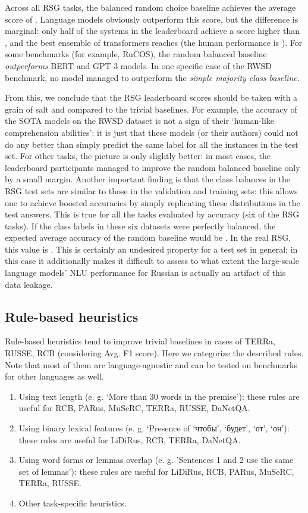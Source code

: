 \documentclass[11pt]{article}
\begin{document}
Across all RSG tasks, the balanced random choice baseline achieves the average score of . Language models obviously outperform this score, but the difference is marginal: only half of the systems in the leaderboard achieve a score higher than , and the best ensemble of transformers reaches  (the human performance is ). For some benchmarks (for example, RuCOS), the random balanced baseline \textit{outperforms} BERT and GPT-3 models. In one specific case of the RWSD benchmark, no model managed to outperform the \textit{simple majority class baseline}.

From this, we conclude that the RSG leaderboard scores should be taken with a grain of salt and compared to the trivial baselines. For example, the  accuracy of the SOTA models on the RWSD dataset is not a sign of their `human-like comprehension abilities': it is just that these models (or their authors) could not do any better than simply predict the same label for all the instances in the test set. For other tasks, the picture is only slightly better: in most cases, the leaderboard participants managed to improve the random balanced baseline only by a small margin. Another important finding is that the class balances in the RSG test sets are similar to those in the validation and training sets: this allows one to achieve boosted accuracies by simply replicating these distributions in the test answers. This is true for all the tasks evaluated by accuracy (six of the RSG tasks). If the class labels in these six datasets were perfectly balanced, the expected average accuracy of the random baseline would be . In the real RSG, this value is .
This is certainly an undesired property for a test set in general; in this case it additionally makes it difficult to assess to what extent the large-scale language models' NLU performance for Russian is actually an artifact of this data leakage.

\subsection{Rule-based heuristics}

Rule-based heuristics tend to improve trivial baselines in cases of TERRa, RUSSE, RCB (considering Avg. F1 score). Here we categorize the described rules. Note that most of them are language-agnostic and can be tested on benchmarks for other languages as well. 

\begin{enumerate}
    \item Using text length (e. g. `More than 30 words in the premise'): these rules are useful for RCB, PARus, MuSeRC, TERRa, RUSSE, DaNetQA.
     \item Using binary lexical features (e. g. `Presence of \foreignlanguage{russian}{`чтобы', `будет', `от', `он')}: these rules are useful for LiDiRus, RCB, TERRa, DaNetQA.
     \item Using word forms or lemmas overlap (e. g. 'Sentences 1 and 2 use the same set of lemmas'): these rules are useful for LiDiRus, RCB, PARus, MuSeRC, TERRa, RUSSE.
     \item Other task-specific heuristics.
\end{enumerate}
\end{document}
